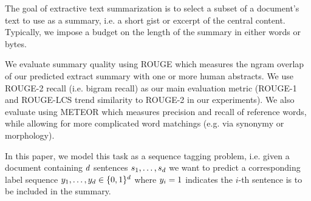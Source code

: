 %

The goal of extractive text summarization is to select a subset of a document's
text to use as a summary, i.e. a short gist or excerpt of the central content.
Typically, we impose a budget on the length of the summary in either 
words or bytes.

We evaluate summary quality using ROUGE \cite{lin2004rouge} 
which measures the ngram
overlap of our predicted extract summary with one or more human abstracts.
We use ROUGE-2 recall (i.e. bigram recall) as our main evaluation metric 
(ROUGE-1 and ROUGE-LCS trend similarity to ROUGE-2 in our experiments).
We also evaluate using METEOR \cite{denkowski:lavie:meteor-wmt:2014}
which measures precision and recall of reference words, while allowing for
more complicated word matchings (e.g. via synonymy or morphology).






In this paper, we model this task as a sequence tagging problem, 
i.e. given a document containing $d$ sentences $\sent_1, \ldots, 
\sent_{\docsize}$ we want to predict a corresponding label sequence $\slabel_1,
\ldots, \slabel_{\docsize} \in \{0, 1\}^{\docsize}$ where $\slabel_i = 1$ 
indicates the $i$-th sentence is to be included in the summary.


